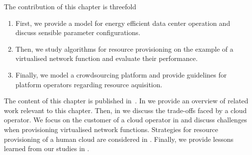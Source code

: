The contribution of this chapter is threefold
\begin{enumerate}
\item First, we provide a model for energy efficient data center operation and discuss sensible parameter configurations. 
\item Then, we study algorithms for resource provisioning on the example of a virtualised network function and evaluate their performance.
\item Finally, we model a crowdsourcing platform and provide guidelines for platform operators regarding resource aquisition.
\end{enumerate}

The content of this chapter is published in~\cite{Schwartz2012a,Metzger2014a,Schwartz2015}.
In  we provide an overview of related work relevant to this chapter.
Then, in  we discuss the trade-offs faced by a cloud operator.
We focus on the customer of a cloud operator in  and discuss challenges when provisioning virtualised network functions.
Strategies for resource provisioning of a human cloud are considered in .
Finally, we provide lessons learned from our studies in .





